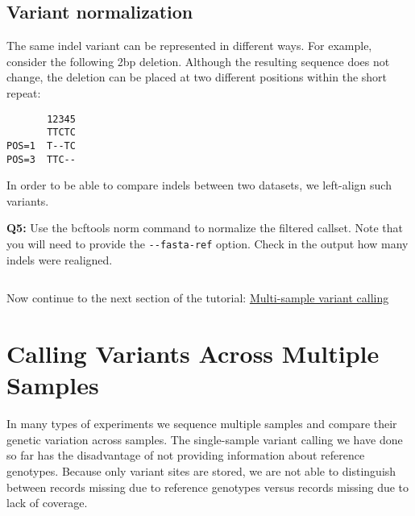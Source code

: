 \documentclass[11pt]{article}
\makeatletter
\newcommand{\boxspacing}{\kern\kvtcb@left@rule\kern\kvtcb@boxsep}
\newcommand{\prompt}[4]{
        {\ttfamily\llap{{\color{#2}[#3]:\hspace{3pt}#4}}\vspace{-\baselineskip}}
    }
\makeatother
\begin{document}
    \hypertarget{variant-normalization}{%
\subsection{Variant normalization}\label{variant-normalization}}

The same indel variant can be represented in different ways. For
example, consider the following 2bp deletion. Although the resulting
sequence does not change, the deletion can be placed at two different
positions within the short repeat:

\begin{verbatim}
       12345
       TTCTC
POS=1  T--TC
POS=3  TTC--
\end{verbatim}

In order to be able to compare indels between two datasets, we
left-align such variants.

\textbf{Q5:} Use the bcftools norm command to normalize the filtered
callset. Note that you will need to provide the \texttt{-\/-fasta-ref}
option. Check in the output how many indels were realigned.

    \begin{tcolorbox}[breakable, size=fbox, boxrule=1pt, pad at break*=1mm,colback=cellbackground, colframe=cellborder]
\prompt{In}{incolor}{ }{\boxspacing}
\begin{Verbatim}[commandchars=\\\{\}]

\end{Verbatim}
\end{tcolorbox}

    Now continue to the next section of the tutorial:
\href{multi-sample-calling.ipynb}{Multi-sample variant calling}





\newpage





    \hypertarget{calling-variants-across-multiple-samples}{%
\section{Calling Variants Across Multiple
Samples}\label{calling-variants-across-multiple-samples}}

In many types of experiments we sequence multiple samples and compare
their genetic variation across samples. The single-sample variant
calling we have done so far has the disadvantage of not providing
information about reference genotypes. Because only variant sites are
stored, we are not able to distinguish between records missing due to
reference genotypes versus records missing due to lack of coverage.
\end{document}
